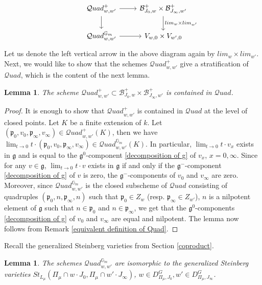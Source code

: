 \documentclass{amsart}
\newcommand{\cQuad}{\mathcal{Q}uad}
\newcommand{\gm}{\mathbb{G}_{m}}
\newcommand{\clz}{lim_{w}}
\newcommand{\cli}{lim_{w'}}
\theoremstyle{plain}
\newtheorem{lemma}[theorem]{Lemma}
\theoremstyle{definition}
\theoremstyle{remark}
\begin{document}
\[
\begin{tikzcd}
& \cQuad_{w,w'}^{+} \arrow{r}{} \arrow{d}[swap]{}
& \mathcal{B}_{J_{0},w}^{+}\times\mathcal{B}_{J_{\infty},w'}^{+} \arrow{d}{\clz\times\cli} \\
& \cQuad_{w,w'}^{\gm} \arrow[swap]{r}{}
& V_{w,0}\times V_{w',0}
\end{tikzcd}
\]
Let us denote the left vertical arrow in the above diagram again by $\clz\times\cli$.
Next, we would like to show that the schemes $\cQuad_{w,w'}^{+}$ give a stratification of $\cQuad$, which is the content of the next lemma.
\begin{lemma}\label{quadquad}
The scheme $\cQuad_{w,w'}^{+}\subset\mathcal{B}^{+}_{J_{0},w}\times\mathcal{B}^{+}_{J_{\infty},w'}$ is contained in $\cQuad$.
\end{lemma}
\begin{proof}
It is enough to show that $\cQuad^{+}_{w,w'}$ is contained in $\cQuad$ at the level of closed points. Let $K$ be a finite extension of $k$. Let $(\mathfrak{p}_{0},v_0,\mathfrak{p}_{\infty},v_\infty)\in \cQuad_{w,w'}^{+}(K)$, then we have $\lim_{t\rightarrow 0}t\cdot(\mathfrak{p}_{0},v_{0},\mathfrak{p}_{\infty},v_{\infty})\in\cQuad_{w,w'}^{\gm}(K)$. In particular, $\lim_{t\to 0}t\cdot v_{x}$ exists in $\mathfrak{g}$ and is equal to the $\mathfrak{g}^{0}$-component \eqref{decomposition of g} of $v_{x}$, $x=0,\infty$.
Since for any $v\in\mathfrak{g}$, $\lim_{t\to 0}t\cdot v$ exists in $\mathfrak{g}$ if and only if the $\mathfrak{g}^{-}$-component \eqref{decomposition of g} of $v$ is zero, the $\mathfrak{g}^{-}$-components of $v_{0}$ and $v_{\infty}$ are zero.
Moreover, since $\cQuad_{w,w'}^{\gm}$ is the closed subscheme of $\cQuad$ consisting of quadruples $(\mathfrak{p}_{0},n,\mathfrak{p}_{\infty},n)$ such that
$\mathfrak{p}_{0}\in Z_{w}$ (resp. $\mathfrak{p}_{\infty}\in Z_{w'}$), $n$ is a nilpotent element of $\mathfrak{g}$ such that $n\in\mathfrak{p}_{0}$ and $n\in\mathfrak{p}_{\infty}$, we get that the $\mathfrak{g}^{0}$-components \eqref{decomposition of g} of $v_{0}$ and $v_{\infty}$ are equal and nilpotent.
The lemma now follows from Remark \ref{equivalent definition of Quad}. 
\end{proof}
Recall the generalized Steinberg varieties from Section \ref{coproduct}.
\begin{lemma}\label{identifying quad with steinberg}
The schemes $\cQuad_{w,w'}^{\gm}$ are isomorphic to the generalized Steinberg varieties $St_{L_{\mu}}(\Pi_{\mu}\cap w\cdot J_{0},\Pi_{\mu}\cap w'\cdot J_{\infty})$, $w\in D^{G}_{\Pi_{\mu},J_{0}}, w'\in D^{G}_{\Pi_{\mu},J_{\infty}}$.
\end{lemma}
\end{document}
